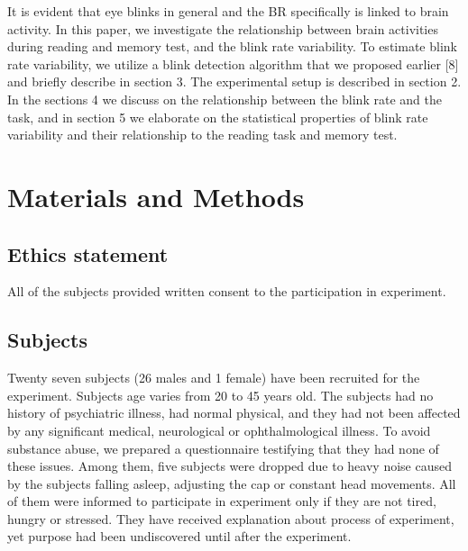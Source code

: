 \documentclass[10pt,letterpaper]{article}
\begin{document}
It is evident that eye blinks in general and the BR specifically is linked to brain activity. In this paper, we investigate the relationship between brain activities during reading and memory test, and the blink rate variability. To estimate blink rate variability, we utilize a blink detection algorithm that we proposed earlier [8] and briefly describe in section 3. The experimental setup is described in section 2. In the sections 4 we discuss on the relationship between the blink rate and the task, and in section 5 we elaborate on the statistical properties of blink rate variability and their relationship to the reading task and memory test.    


\section*{Materials and Methods}
\subsection*{Ethics statement}
All of the subjects provided written consent to the participation in experiment.
\subsection*{Subjects}
Twenty seven subjects (26 males and 1 female) have been recruited for the experiment. Subjects age varies from 20 to 45 years old. The subjects had no history of psychiatric illness, had normal physical, and they had not been affected by any significant medical, neurological or ophthalmological illness. To avoid substance abuse, we prepared a questionnaire testifying that they had none of these issues. Among them, five subjects were dropped due to heavy noise caused by the subjects falling asleep, adjusting the cap or constant head movements.  All of them were informed to participate in experiment only if they are not tired, hungry or stressed. They have received explanation about process of experiment, yet purpose had been undiscovered until after the experiment.
\end{document}
